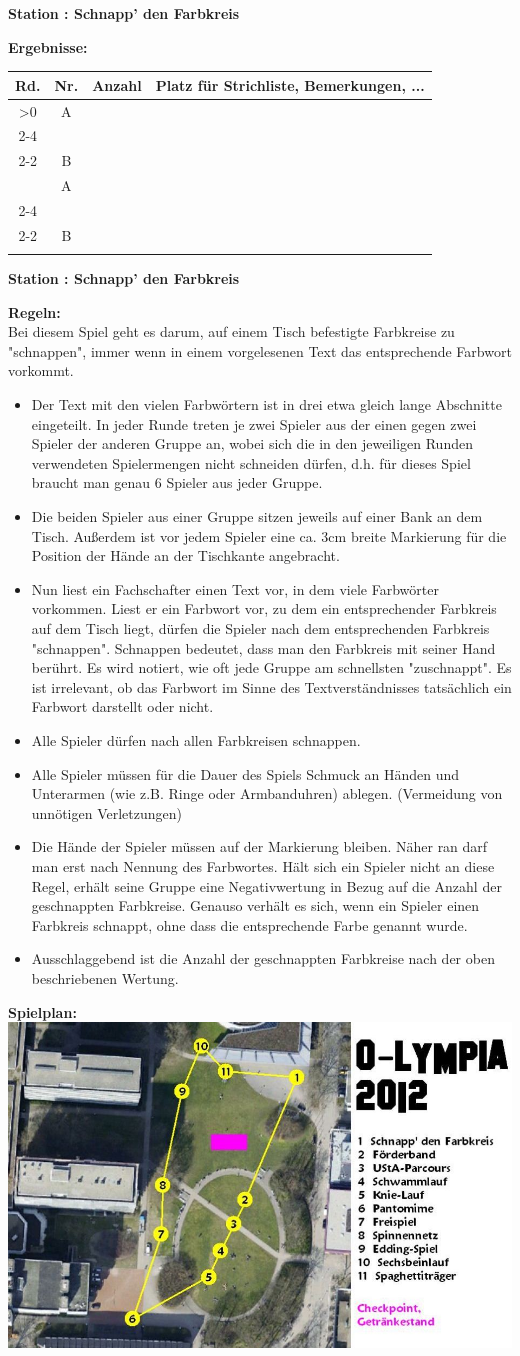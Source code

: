 \documentclass{scrartcl}
\newcommand{\replicate}[2]{\ifnum#1>0 #2
	\expandafter\replicate\expandafter{\number\numexpr#1-1}{#2}\fi}
\newcommand{\modulo}[2]{#1-((#1+#2)/#2-1)*#2}
\newcounter{station}\setcounter{station}{1}
\newcounter{ctrA}
\newcounter{ctrB}
\newcounter{currentRow}
\newcounter{noOfStations}\setcounter{noOfStations}{11}
\newenvironment{stationsheet}[3]
{\begin{center} \textbf{\huge Station \arabic{station}: #1}\\[2em]\end{center}
\textbf{\Large Ergebnisse:}\\[1em]
\setcounter{ctrA}{\value{station}}
\setcounter{ctrB}{\value{station}}
\setcounter{currentRow}{1}
\begin{tabular}{|c|c|p{3cm}|p{11cm}|}
\hline
\textbf{Rd.} & \textbf{Nr.} & \textbf{#2} & \textbf{Platz für Strichliste, Bemerkungen, ...}\\ \hline
\replicate{\value{noOfStations}}
{
\multirow{2}{*}{\arabic{currentRow}} & A\arabic{ctrA} & &
\ifthenelse{#3=0}{\\ \cline{2-4}}{\\ \cline{2-2}}
 & B\arabic{ctrB} & & \stepcounter{currentRow}
\setcounter{ctrA}{1+\modulo{\value{ctrA}-2}{\value{noOfStations}}}
\setcounter{ctrB}{1+\modulo{\value{ctrB}}{\value{noOfStations}}}
\\ \hline
}
\end{tabular}
\clearpage
\begin{center}\textbf{\huge Station \arabic{station}: #1}\end{center}
\textbf{\Large Regeln:}\\[1em]
}
{
\textbf{\Large Spielplan:}\\[1em]
\includegraphics[scale=0.57]{spielplan_11.png}
\addtocounter{station}{1}
\clearpage
}
\begin{document}
\begin{stationsheet}{Schnapp' den Farbkreis}{Anzahl}{0}
Bei diesem Spiel geht es darum, auf einem Tisch befestigte Farbkreise zu "schnappen", immer wenn in einem vorgelesenen Text das entsprechende Farbwort vorkommt.
\begin{itemize}
\item Der Text mit den vielen Farbwörtern ist in drei etwa gleich lange Abschnitte eingeteilt. In jeder Runde treten je zwei Spieler aus der einen gegen zwei Spieler der anderen Gruppe an, wobei sich die in den jeweiligen Runden verwendeten Spielermengen nicht schneiden dürfen, d.h. für dieses Spiel braucht man genau 6 Spieler aus jeder Gruppe. \item Die beiden Spieler aus einer Gruppe sitzen jeweils auf einer Bank an dem Tisch. Außerdem ist vor jedem Spieler eine ca. 3cm breite Markierung für die Position der Hände an der Tischkante angebracht.
\item Nun liest ein Fachschafter einen Text vor, in dem viele Farbwörter vorkommen. Liest er ein Farbwort vor, zu dem ein entsprechender Farbkreis auf dem Tisch liegt, dürfen die Spieler nach dem entsprechenden Farbkreis "schnappen". Schnappen bedeutet, dass man den Farbkreis mit seiner Hand berührt. Es wird notiert, wie oft jede Gruppe am schnellsten "zuschnappt". Es ist irrelevant, ob das Farbwort im Sinne des Textverständnisses tatsächlich ein Farbwort darstellt oder nicht.
\item Alle Spieler dürfen nach allen Farbkreisen schnappen.
\item Alle Spieler müssen für die Dauer des Spiels Schmuck an Händen und Unterarmen (wie z.B. Ringe oder Armbanduhren) ablegen. (Vermeidung von unnötigen Verletzungen)
\item Die Hände der Spieler müssen auf der Markierung bleiben. Näher ran darf man erst nach Nennung des Farbwortes. Hält sich ein Spieler nicht an diese Regel, erhält seine Gruppe eine Negativwertung in Bezug auf die Anzahl der geschnappten Farbkreise. Genauso verhält es sich, wenn ein Spieler einen Farbkreis schnappt, ohne dass die entsprechende Farbe genannt wurde.
\item Ausschlaggebend ist die Anzahl der geschnappten Farbkreise nach der oben beschriebenen Wertung.
\end{itemize}
\end{stationsheet}
\end{document}
